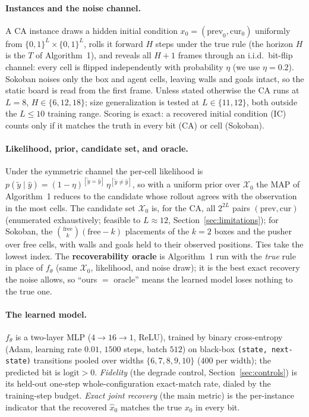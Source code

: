 \documentclass{article}
\begin{document}
\paragraph{Instances and the noise channel.}
A CA instance draws a hidden initial condition $x_0 = (\text{prev}_0, \text{cur}_0)$ uniformly from
$\{0,1\}^L \times \{0,1\}^L$, rolls it forward $H$ steps under the true rule (the horizon $H$ is the
$T$ of Algorithm~1), and reveals all $H{+}1$
frames through an i.i.d.\ bit-flip channel: every cell is flipped independently with probability
$\eta$ (we use $\eta = 0.2$). Sokoban noises only the box and agent cells, leaving walls and goals
intact, so the static board is read from the first frame. Unless stated otherwise the CA runs at
$L=8$, $H \in \{6,12,18\}$; size generalization is tested at $L \in \{11,12\}$, both outside the
$L \le 10$ training range. Scoring is exact: a recovered initial condition (IC) counts only if it matches the truth in
every bit (CA) or cell (Sokoban).

\paragraph{Likelihood, prior, candidate set, and oracle.}
Under the symmetric channel the per-cell likelihood is $p(\tilde y \mid \hat y) =
(1-\eta)^{[\tilde y = \hat y]}\,\eta^{[\tilde y \ne \hat y]}$, so with a uniform prior over
$\mathcal{X}_0$ the MAP of Algorithm~1 reduces to the candidate whose rollout agrees with the
observation in the most cells. The candidate set $\mathcal{X}_0$ is, for the CA, all $2^{2L}$ pairs
$(\text{prev}, \text{cur})$ (enumerated exhaustively; feasible to $L \approx 12$, Section~\ref{sec:limitations});
for Sokoban, the $\binom{\text{free}}{k}(\text{free}-k)$ placements of the $k{=}2$ boxes and the
pusher over free cells, with walls and goals held to their observed positions. Ties take the lowest
index. The \textbf{recoverability oracle} is Algorithm~1 run with the \emph{true} rule in place of
$f_\theta$ (same $\mathcal{X}_0$, likelihood, and noise draw); it is the best exact recovery the noise
allows, so ``ours $=$ oracle'' means the learned model loses nothing to the true one.

\paragraph{The learned model.}
$f_\theta$ is a two-layer MLP ($4 \to 16 \to 1$, ReLU), trained by binary cross-entropy (Adam, learning
rate $0.01$, $1500$ steps, batch $512$) on black-box \texttt{(state, next-state)} transitions pooled
over widths $\{6,7,8,9,10\}$ ($400$ per width); the predicted bit is $\text{logit} > 0$.
\emph{Fidelity} (the degrade control, Section~\ref{sec:controls}) is its held-out one-step
whole-configuration exact-match rate, dialed by the training-step budget. \emph{Exact joint recovery}
(the main metric) is the per-instance indicator that the recovered $\hat x_0$ matches the true $x_0$
in every bit.
\end{document}
